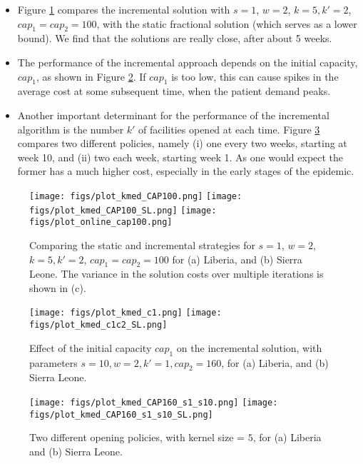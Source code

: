 \begin{itemize}
\item
Figure \ref{fig:online1} compares the incremental solution with 
$s=1$, $w=2$, $k=5, k' = 2$, $cap_1 = cap_2 = 100$, with the static fractional solution
(which serves as a lower bound). We find that the solutions are really close, after about 5 weeks.
\item
The performance of the incremental approach depends on the initial capacity, $cap_1$, as shown
in Figure \ref{fig:online2}. If $cap_1$ is too low, this can cause spikes in the average cost
at some subsequent time, when the patient demand peaks.
\item
Another important determinant for the performance of the incremental algorithm is the
number $k'$ of facilities opened at each time. Figure \ref{fig:online3} compares two different
policies, namely (i) one every two weeks, starting at week 10, and
(ii) two each week, starting week 1. As one would expect the former has a much
higher cost, especially in the early stages of the epidemic.
\end{itemize}

\begin{figure}[h]
  \centering %
    \texttt{[image: figs/plot\_kmed\_CAP100.png]}
    \texttt{[image: figs/plot\_kmed\_CAP100\_SL.png]}
    \texttt{[image: figs/plot\_online\_cap100.png]}
    \caption{Comparing the static and incremental strategies for
$s=1$, $w=2$, $k=5, k' = 2$, $cap_1 = cap_2 = 100$ for
(a) Liberia, and (b) Sierra Leone.
The variance in the solution costs over multiple iterations is shown in (c).}
\label{fig:online1}
\end{figure}

\begin{figure}[h]
  \centering %
    \texttt{[image: figs/plot\_kmed\_c1.png]}
    \texttt{[image: figs/plot\_kmed\_c1c2\_SL.png]}
    \caption{Effect of the initial capacity $cap_1$ on the incremental solution, with
parameters $s = 10, w = 2, k' = 1, cap_2 = 160$, for (a) Liberia, and (b) Sierra Leone.}
\label{fig:online2}
\end{figure}

\begin{figure}[h]
  \centering %
    \texttt{[image: figs/plot\_kmed\_CAP160\_s1\_s10.png]}
    \texttt{[image: figs/plot\_kmed\_CAP160\_s1\_s10\_SL.png]}
    \caption{Two different opening policies, with kernel size = $5$, for
(a) Liberia and (b) Sierra Leone.}
\label{fig:online3}
\end{figure}


